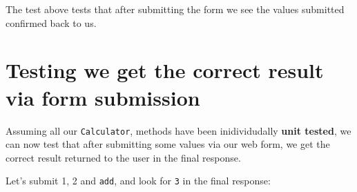 \documentclass[a4paperpaper,openright]{book}
\begin{document}
The test above tests that after submitting the form we see the values
submitted confirmed back to us.

\hypertarget{testing-we-get-the-correct-result-via-form-submission}{%
\section{Testing we get the correct result via form
submission}\label{testing-we-get-the-correct-result-via-form-submission}}

Assuming all our \texttt{Calculator}, methods have been inidividudally
\textbf{unit tested}, we can now test that after submitting some values
via our web form, we get the correct result returned to the user in the
final response.

Let's submit 1, 2 and \texttt{add}, and look for \texttt{3} in the final
response:
\end{document}
